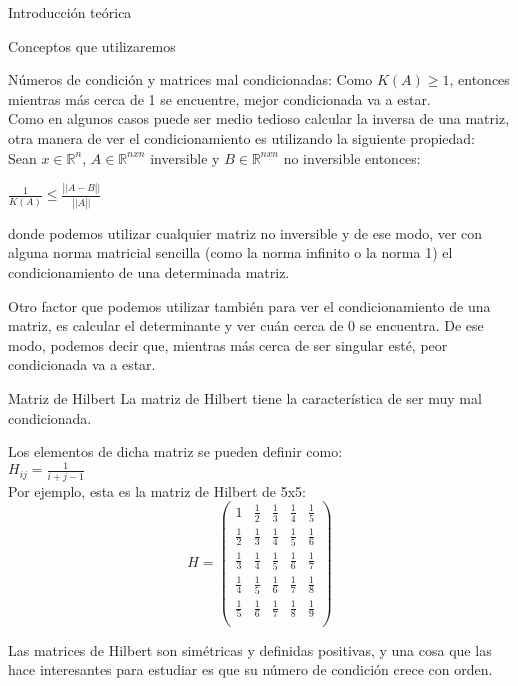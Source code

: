 \begin{section}{Introducción teórica}
\begin{subsection}{Conceptos que utilizaremos}
\begin{subsubsection}{Números de condición y matrices mal condicionadas:}
			Como $K(A) \geq 1$, entonces mientras más cerca de 1 se encuentre, mejor condicionada va a estar.\\
			
			Como en algunos casos puede ser medio tedioso calcular la inversa de una matriz, otra manera de ver el condicionamiento es utilizando la siguiente propiedad:\\

			Sean $x \in \mathbb{R}^n$, $A \in \mathbb{R}^{nxn}$ inversible y $B \in \mathbb{R}^{nxn}$ no inversible entonces:\\
			
			\begin{center} $\frac{1}{K(A)} \leq \frac{\left|| A-B \right||}{\left|| A \right||}$ \end{center}
	
			donde podemos utilizar cualquier matriz no inversible y de ese modo, ver con alguna norma matricial sencilla (como la norma infinito o la norma 1) el condicionamiento de una determinada matriz.
			
			Otro factor que podemos utilizar también para ver el condicionamiento de una matriz, es calcular el determinante y ver cuán cerca de 0 se encuentra. De ese modo, podemos decir que, mientras más cerca de ser singular esté, peor condicionada va a estar.
		\end{subsubsection}
		\begin{subsubsection}{Matriz de Hilbert}		
			La matriz de Hilbert tiene la característica de ser muy mal condicionada.
			
			Los elementos de dicha matriz se pueden definir como: \\
			
			$H_{ij} = \frac{1}{i+j-1}$\\
			
			Por ejemplo, esta es la matriz de Hilbert de 5x5:
			\[H = \left( \begin{array}{lcccr}
									1      & \frac{1}{2}    & \frac{1}{3} & \frac{1}{4} &  \frac{1}{5}\\
						  \frac{1}{2}      & \frac{1}{3}    & \frac{1}{4} & \frac{1}{5} &  \frac{1}{6}\\
						  \frac{1}{3}      & \frac{1}{4}    & \frac{1}{5} & \frac{1}{6} &  \frac{1}{7}\\
						  \frac{1}{4}      & \frac{1}{5}    & \frac{1}{6} & \frac{1}{7} &  \frac{1}{8}\\
						  \frac{1}{5}      & \frac{1}{6}    & \frac{1}{7} & \frac{1}{8} &  \frac{1}{9}\\
					   \end{array}
				\right)
			\]

			Las matrices de Hilbert son simétricas y definidas positivas, y una cosa que las hace interesantes para estudiar es que su número de condición crece con orden.
		\end{subsubsection}
	\end{subsection}
\end{section}
